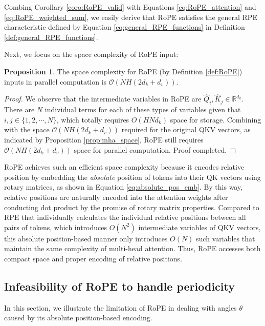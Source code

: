 \documentclass[lettersize,journal]{IEEEtran}
\theoremstyle{definition}
\newtheorem{proposition}{Proposition}
\begin{document}
Combing Corollary \ref{coro:RoPE_valid} with Equations \eqref{eq:RoPE_attention} and \eqref{eq:RoPE_weighted_sum}, we easily derive that RoPE satisfies the general RPE characteristic defined by Equation \eqref{eq:general_RPE_functions} in Definition \ref{def:general_RPE_functions}.

Next, we focus on the space complexity of RoPE input:


\begin{proposition}
\label{prop:rope_space}
The space complexity for RoPE (by Definition \ref{def:RoPE}) inputs  in parallel computation is \(\mathcal{O}(NH(2d_k+d_v))\).
\end{proposition}

\begin{proof}
We observe that the intermediate variables in RoPE are $\hat{Q}_i,\hat{K}_j\in \mathbb{R}^{d_k}$.
There are $N$ individual terms for each of these types of variables given that $i,j\in \{1,2,\cdots, N\}$, which totally requires $O(HNd_k)$ space for storage. Combining with the space \(\mathcal{O}(NH(2d_k+d_v))\) required for the original QKV vectors, as indicated by Proposition \ref{prop:mha_space}, RoPE still requires \(\mathcal{O}(NH(2d_k+d_v))\) space for parallel computation. Proof completed.
\end{proof}

RoPE achieves such an efficient space complexity because it encodes relative position by embedding the \textit{absolute} position of tokens into their QK vectors using rotary matrices, as shown in Equation \eqref{eq:absolute_pos_emb}.
By this way, relative positions are naturally encoded into the attention weights after conducting dot product by the promise of rotary matrix properties.
Compared to RPE that individually calculates the individual relative positions between all pairs of tokens, which introduces $O(N^2)$ intermediate variables of QKV vectors, this absolute position-based manner only introduces $O(N)$ such variables that maintain the same complexity of multi-head attention.
Thus, RoPE accesses both compact space and proper encoding of relative positions.

\subsection{Infeasibility of RoPE to handle periodicity}
\label{sec:rope_limitation}

In this section, we illustrate the limitation of RoPE in dealing with angles $\theta$ caused by its absolute position-based encoding.
\end{document}
